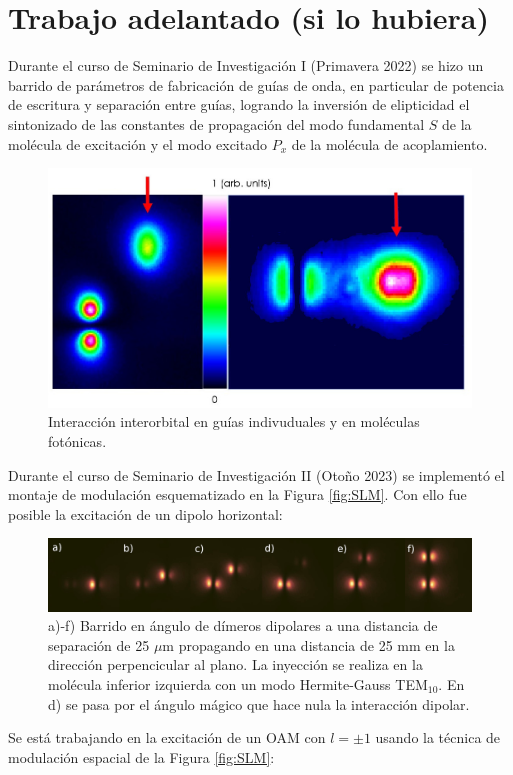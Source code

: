 \documentclass{article}
\begin{document}
\section{Trabajo adelantado (si lo hubiera)}

Durante el curso de Seminario de Investigación I (Primavera 2022) se hizo un barrido de parámetros de fabricación de guías de onda, en particular de potencia de escritura y separación entre guías, logrando la inversión de elipticidad el sintonizado de las constantes de propagación del modo fundamental $S$ de la molécula de excitación y el modo excitado $P_x$ de la molécula de acoplamiento.


\begin{figure}[H]
	\centering
	\includegraphics[width=0.5\linewidth]{./media/SPinteraction.jpg}
	\caption{Interacción interorbital en guías indivuduales y en moléculas fotónicas.}
\end{figure}

Durante el curso de Seminario de Investigación II (Otoño 2023) se implementó el montaje de modulación esquematizado en la Figura \ref{fig:SLM}. Con ello fue posible la excitación de un dipolo horizontal:

\begin{figure}[H]
	\centering
	\includegraphics[width=1.0\linewidth]{./media/dipoles.jpg}
	\caption{a)-f) Barrido en ángulo de dímeros dipolares a una distancia de separación de 25 $\mu$m propagando en una distancia de 25 mm en la dirección perpencicular al plano. La inyección se realiza en la molécula inferior izquierda con un modo Hermite-Gauss TEM$_{10}$. En d) se pasa por el ángulo mágico que hace nula la interacción dipolar.}
\end{figure}

Se está trabajando en la excitación de un OAM con $l = \pm 1$ usando la técnica de modulación espacial de la Figura \ref{fig:SLM}:
\end{document}

